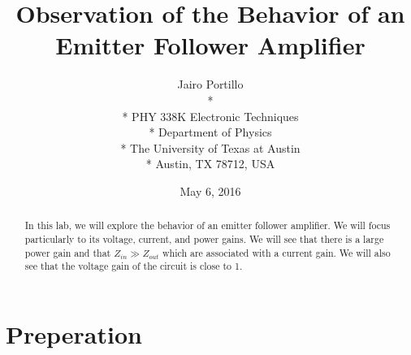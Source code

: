 \documentclass[11pt,letterpaper,onecolumn]{article}
\begin{document}

\title{\bf Observation of the Behavior of an Emitter Follower Amplifier}

\author{
 Jairo Portillo \\*
  \\*
 PHY 338K Electronic Techniques \\*
 Department of Physics \\*
 The University of Texas at Austin \\*
 Austin, TX 78712, USA
}
\date{May 6, 2016}


\maketitle


\begin{abstract}

In this lab, we will explore the behavior of an emitter follower amplifier. We will focus particularly to its voltage, current, and power gains. We will see that there is a large power gain and that $Z_{in} \gg Z_{out}$ which are associated with a current gain. We will also see that the voltage gain of the circuit is close to 1.

\end{abstract}



\section{Preperation}
\end{document}
